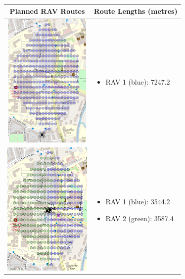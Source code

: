 \begin{table}[h!]
  \centering
  \begin{tabular}{ | c | m{5cm} | }
    \hline
    Planned RAV Routes & Route Lengths (metres) \\
    \hline
    
    \begin{minipage}[c][68mm][c]{.6\textwidth}
      \includegraphics[width=\linewidth, height=66mm]{Chapters/MultiAgentCoverage/MultipleTravellingSalesman/Figs/Hexagon/OneRAV.PNG}
    \end{minipage}
    &
    \begin{itemize}[leftmargin=*]
      \item[] RAV 1 (blue): 7247.2
    \end{itemize}
    \\
    \hline
    \begin{minipage}[c][68mm][c]{.6\textwidth}
      \includegraphics[width=\linewidth, height=66mm]{Chapters/MultiAgentCoverage/MultipleTravellingSalesman/Figs/Hexagon/TwoRAV.PNG}
    \end{minipage}
    &
    \begin{itemize}[leftmargin=*]
        \item[] RAV 1 (blue): 3544.2
        \item[] RAV 2 (green): 3587.4
    \end{itemize}
    \\
    \hline
    

\end{tabular}
\end{table}
